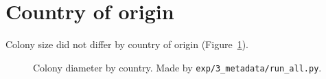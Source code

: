 \section{Country of origin}
Colony size did not differ by country of origin (Figure~\ref{fig:country}).
\begin{figure}
  \centering
  \caption{Colony diameter by country. Made by \texttt{exp/3\_metadata/run\_all.py}.}
  \label{fig:country}
\end{figure}
